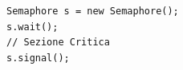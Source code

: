\begin{lstlisting}
Semaphore s = new Semaphore();
s.wait();
// Sezione Critica
s.signal();
\end{lstlisting}
